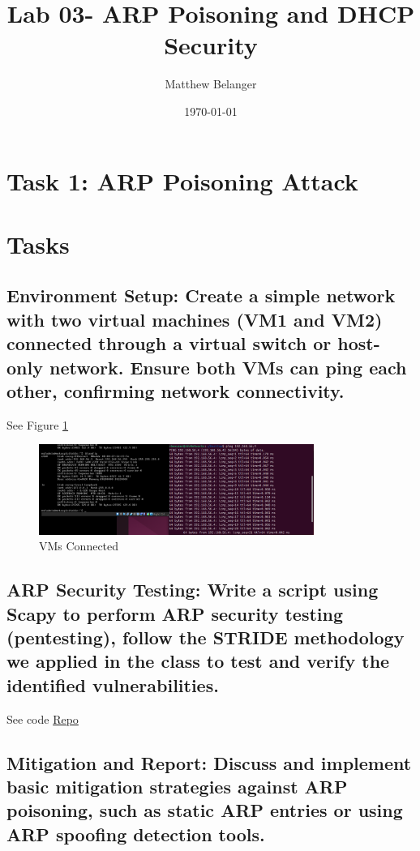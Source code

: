 \documentclass{article}
\title{Lab 03- ARP Poisoning and DHCP Security}
\author{Matthew Belanger}
\date{\today}
\begin{document}
\maketitle

\newpage



\section{Task 1: ARP Poisoning Attack}
\label{sec:task1}

\section*{Tasks}

\subsection{\textbf{Environment Setup}: Create a simple network with two virtual machines (VM1 and VM2) connected
through a virtual switch or host-only network. Ensure both VMs can ping each other, confirming
network connectivity.}

See Figure \ref{fig:connected}

\begin{figure}[h]
    \centering
    \includegraphics[width=0.8\textwidth]{task1/screenshot/connected.png}
    \caption{VMs Connected}
    \label{fig:connected}
\end{figure}


\subsection{\textbf{ARP Security Testing}: Write a script using Scapy to perform ARP security testing (pentesting), follow the STRIDE methodology we applied in the class to test and verify the identified vulnerabilities.}

See code \href{https://github.com/MattBelanger321/COMP8670/tree/master/lab3/task1}{Repo}

\subsection{\textbf{Mitigation and Report}: Discuss and implement basic mitigation strategies against ARP poisoning,
such as static ARP entries or using ARP spoofing detection tools.}
\end{document}
